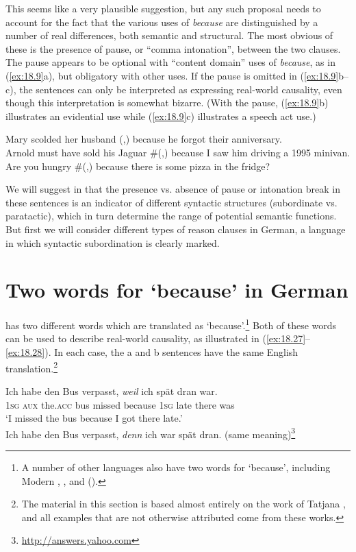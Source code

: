 This seems like a very plausible suggestion, but any such proposal needs to account for the fact that the various uses of \textit{because} are distinguished by a number of real differences, both semantic and structural. The most obvious of these is the presence of pause, or “comma intonation”, between the two clauses. The pause appears to be optional with “content domain” uses of \textit{because}, as in (\ref{ex:18.9}a), but obligatory with other uses. If the pause is omitted in (\ref{ex:18.9}b--c), the sentences can only be interpreted as expressing real-world causality, even though this interpretation is somewhat bizarre. (With the pause, (\ref{ex:18.9}b) illustrates an evidential use while (\ref{ex:18.9}c) illustrates a speech act use.)


\ea \label{ex:18.9}
\ea  Mary scolded her husband (,) because he forgot their anniversary.\\
\ex Arnold must have sold his Jaguar \#(,) because I saw him driving a 1995 minivan.\\
\ex Are you hungry \#(,) because there is some pizza in the fridge?
                       \z
\z


We will suggest in  that the presence vs. absence of pause or intonation break in these sentences is an indicator of different syntactic structures (subordinate vs. paratactic), which in turn determine the range of potential semantic functions. But first we will consider different types of reason clauses in German, a language in which syntactic subordination is clearly marked.\largerpage[-2]


\section{Two words for ‘because’ in German}\label{sec:18.5}


 has two different words which are translated as ‘because’.\footnote{A number of other languages also have two words for ‘because’, including Modern , , and  (\citealt{Pit2003,Kitis2006}).} Both of these words can be used to describe real-world causality, as illustrated in (\ref{ex:18.27}--\ref{ex:18.28}). In each case, the a and b sentences have the same English translation.\footnote{The material in this section is based almost entirely on the work of Tatjana \citet{Scheffler2005,Scheffler2008}, and all examples that are not otherwise attributed come from these works.} 


\ea \label{ex:18.27}
\ea  \gll Ich  habe  den  Bus  verpasst,  \textit{weil}  ich  spät  dran  war.\\
\textsc{1sg}  \textsc{aux}  the.\textsc{acc}  bus  missed  because  \textsc{1sg}  late  there  was\\
\glt ‘I missed the bus because I got there late.’ \\
\ex  Ich habe den Bus verpasst, \textit{denn} ich war spät dran. (same meaning)\footnote{\url{http://answers.yahoo.com}}
\z \z

